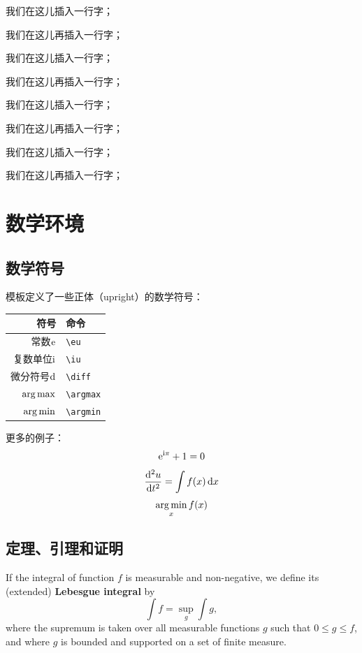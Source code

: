 我们在这儿插入一行字；

我们在这儿再插入一行字；

我们在这儿插入一行字；

我们在这儿再插入一行字；

我们在这儿插入一行字；

我们在这儿再插入一行字；

我们在这儿插入一行字；

我们在这儿再插入一行字；

\section{数学环境}

\subsection{数学符号}

模板定义了一些正体（upright）的数学符号：
\begin{center}
  \begin{tabular}{rl}
    \toprule
    符号                 & 命令 \\
    \midrule
    常数$\mathrm{e}$     & \verb|\eu| \\
    复数单位$\mathrm{i}$ & \verb|\iu| \\
    微分符号$\mathop{}\!\mathrm{d}$ & \verb|\diff| \\
    $\operatorname*{arg\,max}$         & \verb|\argmax| \\
    $\operatorname*{arg\,min}$         & \verb|\argmin| \\
    \bottomrule
  \end{tabular}
\end{center}

更多的例子：
\begin{equation}
\mathrm{e}^{\mathrm{i}\pi} + 1 = 0
\end{equation}
\begin{equation}
\frac{\mathop{}\!\mathrm{d}^2u}{\mathop{}\!\mathrm{d} t^2} = \int f(x) \mathop{}\!\mathrm{d} x
\end{equation}
\begin{equation}
\operatorname*{arg\,min}_x f(x)
\end{equation}

\subsection{定理、引理和证明}

\begin{definition}
  If the integral of function $f$ is measurable and non-negative, we define
  its (extended) \textbf{Lebesgue integral} by
  \begin{equation}
  \int f = \sup_g \int g,
  \end{equation}
  where the supremum is taken over all measurable functions $g$ such that
  $0 \leq g \leq f$, and where $g$ is bounded and supported on a set of
  finite measure.
\end{definition}


